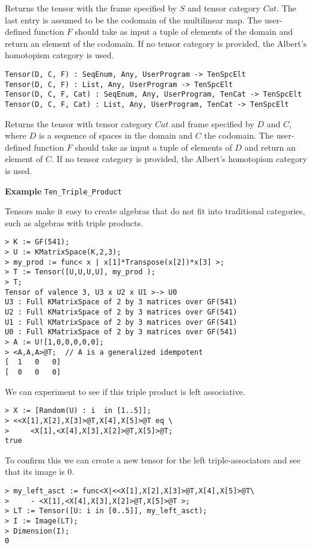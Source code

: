 Returns the tensor with the frame specified by $S$ and tensor category $Cat$. 
The last entry is assumed to be the codomain of the multilinear map. 
The user-defined function $F$ should take as
input a tuple of elements of the domain and return an element of the codomain.
If no tensor category is provided, the Albert's homotopism category is used.


\color{blue}
{\small \begin{verbatim}
Tensor(D, C, F) : SeqEnum, Any, UserProgram -> TenSpcElt
Tensor(D, C, F) : List, Any, UserProgram -> TenSpcElt
Tensor(D, C, F, Cat) : SeqEnum, Any, UserProgram, TenCat -> TenSpcElt
Tensor(D, C, F, Cat) : List, Any, UserProgram, TenCat -> TenSpcElt
\end{verbatim} }
\color{black}

Returns the tensor with tensor category $Cat$ and frame specified by $D$ and $C$, where $D$ is a sequence 
of spaces in the domain and $C$ the codomain. 
The user-defined function $F$ should take as input a tuple of elements of $D$ and return an element of $C$.
If no tensor category is provided, the Albert's homotopism category is used.

\medskip
\begin{framed}{\bf Example} {\tt Ten\_Triple\_Product}\\
{\small
Tensors make it easy to create algebras that do not fit into traditional
categories, such as algebras with triple products.
\begin{lstlisting}[frame=single,basicstyle=\ttfamily\color{black!30!
teal},backgroundcolor=\color{white!70!gray}]
> K := GF(541);
> U := KMatrixSpace(K,2,3);
> my_prod := func< x | x[1]*Transpose(x[2])*x[3] >;
> T := Tensor([U,U,U,U], my_prod );
> T;
Tensor of valence 3, U3 x U2 x U1 >-> U0
U3 : Full KMatrixSpace of 2 by 3 matrices over GF(541)
U2 : Full KMatrixSpace of 2 by 3 matrices over GF(541)
U1 : Full KMatrixSpace of 2 by 3 matrices over GF(541)
U0 : Full KMatrixSpace of 2 by 3 matrices over GF(541)
> A := U![1,0,0,0,0,0];
> <A,A,A>@T;  // A is a generalized idempotent
[  1   0   0]
[  0   0   0]
\end{lstlisting}
We can experiment to see if this triple product is left associative.
\begin{lstlisting}[frame=single,basicstyle=\ttfamily\color{black!30!
teal},backgroundcolor=\color{white!70!gray}]
> X := [Random(U) : i  in [1..5]];
> <<X[1],X[2],X[3]>@T,X[4],X[5]>@T eq \
>     <X[1],<X[4],X[3],X[2]>@T,X[5]>@T;
true
\end{lstlisting}
To confirm this we can create a new tensor for the left 
triple-associators and see that its image is $0$.
\begin{lstlisting}[frame=single,basicstyle=\ttfamily\color{black!30!
teal},backgroundcolor=\color{white!70!gray}]
> my_left_asct := func<X|<<X[1],X[2],X[3]>@T,X[4],X[5]>@T\
>     - <X[1],<X[4],X[3],X[2]>@T,X[5]>@T >;
> LT := Tensor([U: i in [0..5]], my_left_asct);
> I := Image(LT);
> Dimension(I);
0
\end{lstlisting}
}
\end{framed}


